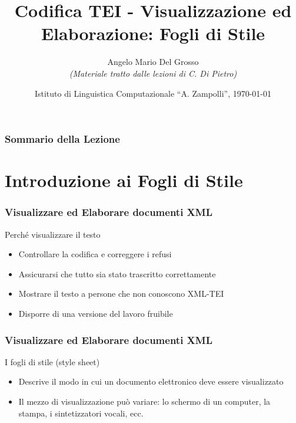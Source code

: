 \documentclass{beamer}
\title{Codifica TEI - Visualizzazione ed Elaborazione: Fogli di Stile}
\author[A.M. Del Grosso]{Angelo Mario Del Grosso \\ \tiny\textit{(Materiale tratto dalle lezioni di C. Di Pietro)}}
\institute{\texttt{angelo.delgrosso@ilc.cnr.it} \\\textit{CNR-ILC-LicoLab} \\\url{http://licolab.ilc.cnr.it/}}
\date{Istituto di Linguistica Computazionale ``A. Zampolli'', \today}
\begin{document}
    
    \begin{frame}
        \maketitle
    \end{frame}
    
    \begin{frame}
        \frametitle{Sommario della Lezione}
        \tableofcontents
    \end{frame}
    
    \section{Introduzione ai Fogli di Stile}
    
    \begin{frame}
        \frametitle{Visualizzare ed Elaborare documenti XML}
        \addtocounter{nframe}{1}
        

         \begin{block}{Perché visualizzare il testo}
             \begin{itemize}
                \item Controllare la codifica e correggere i refusi
                \item Assicurarsi che tutto sia stato trascritto correttamente
                \item Mostrare il testo a persone che non conoscono XML-TEI
                \item Disporre di una versione del lavoro fruibile
            \end{itemize}
         \end{block}
        
    \end{frame}
    
    \begin{frame}
        \frametitle{Visualizzare ed Elaborare documenti XML}
        \addtocounter{nframe}{1}
        
        \begin{block}{I fogli di stile (style sheet)}
           \begin{itemize}
               \item Descrive il modo in cui un documento elettronico deve essere visualizzato
               \item Il mezzo di visualizzazione può variare: lo schermo di un computer, la stampa, i sintetizzatori vocali, ecc.
           \end{itemize}
        \end{block}
        
    \end{frame}
    
\end{document}

